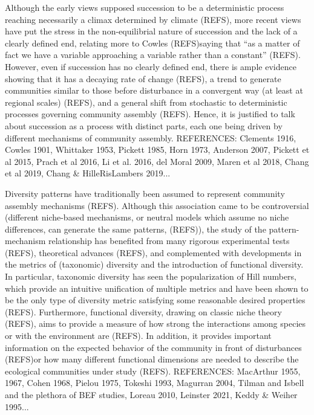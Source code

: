 \documentclass[a4paper, 9pt]{article}
\newcommand{\refs}{(\alert{REFS})}
\begin{document}
	Although the early views supposed succession to be a deterministic process reaching necessarily a climax determined by climate \refs, more recent views have put the stress in the non-equilibrial nature of succession and the lack of a clearly defined end, relating more to Cowles \refs saying that “as a matter of fact we have a variable approaching a variable rather than a constant” \refs. However, even if succession has no clearly defined end, there is ample evidence showing that it has a decaying rate of change \refs, a trend to generate communities similar to those before disturbance in a convergent way (at least at regional scales) \refs, and a general shift from stochastic to deterministic processes governing community assembly \refs. Hence, it is justified to talk about succession as a process with distinct parts, each one being driven by different mechanisms of community assembly.
	\alert{REFERENCES: Clements 1916, Cowles 1901, Whittaker 1953, Pickett 1985, Horn 1973, Anderson 2007, Pickett et al 2015, Prach et al 2016, Li et al. 2016, del Moral 2009, Maren et al 2018, Chang et al 2019, Chang \& HilleRisLambers 2019...}
	
	Diversity patterns have traditionally been assumed to represent community assembly mechanisms \refs. Although this association came to be controversial (different niche-based mechanisms, or neutral models which assume no niche differences, can generate the same patterns, \refs), the study of the pattern-mechanism relationship has benefited from many rigorous experimental tests \refs, theoretical advances \refs, and complemented with developments in the metrics of (taxonomic) diversity and the introduction of functional diversity. In particular, taxonomic diversity has seen the popularization of Hill numbers, which provide an intuitive unification of multiple metrics and have been shown to be the only type of diversity metric satisfying some reasonable desired properties \refs. Furthermore, functional diversity, drawing on classic niche theory \refs, aims to provide a measure of how strong the interactions among species or with the environment are \refs. In addition, it provides important information on the expected behavior of the community in front of disturbances \refs or how many different functional dimensions are needed to describe the ecological communities under study \refs.
	\alert{REFERENCES: MacArthur 1955, 1967, Cohen 1968, Pielou 1975, Tokeshi 1993, Magurran 2004, Tilman and Isbell and the plethora of BEF studies, Loreau 2010, Leinster 2021, Keddy \& Weiher 1995...}
	
\end{document}
